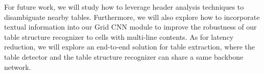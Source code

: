 \documentclass[final,3p,times,twocolumn]{elsarticle}
\begin{document}
For future work, we will study how to leverage header analysis techniques to disambiguate nearby tables. Furthermore, we will also explore how to incorporate textual information into our Grid CNN module to improve the robustness of our table structure recognizer to cells with multi-line contents. {\color{black}{To achieve more robust structure recognition of dense tables, we will study effective technologies for adaptive scaling.}} As for latency reduction, we will explore an end-to-end solution for table extraction, where the table detector and the table structure recognizer can share a same backbone network.


\end{document}
